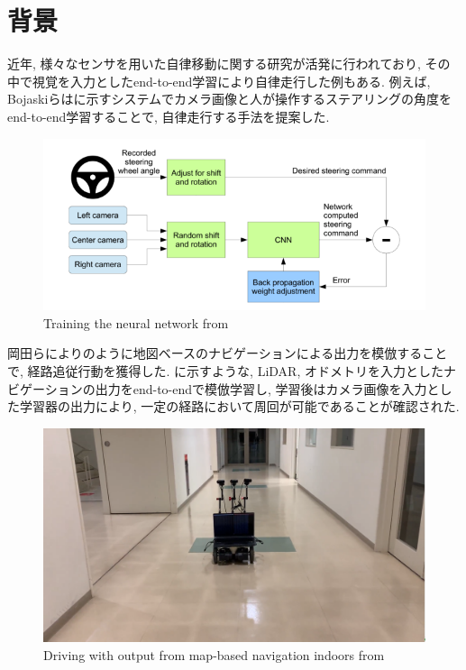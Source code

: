 
\section{背景}
近年, 様々なセンサを用いた自律移動に関する研究が活発に行われており, その中で視覚を入力としたend-to-end学習により自律走行した例もある. 例えば, Bojaskiらはに示すシステムでカメラ画像と人が操作するステアリングの角度をend-to-end学習することで, 自律走行する手法を提案した\cite{bojaski}.

\vspace{20mm}

\begin{figure}[hbtp]
\centering
\includegraphics[keepaspectratio, scale=0.5]
{images/bojaski.png}
\caption{Training the neural network from \cite{bojaski}}
\label{Fig:bojaski}
\end{figure}

\newpage
岡田らによりのように地図ベースのナビゲーションによる出力を模倣することで, 経路追従行動を獲得した\cite{okada-si}. に示すような, LiDAR, オドメトリを入力としたナビゲーションの出力をend-to-endで模倣学習し, 学習後はカメラ画像を入力とした学習器の出力により, 一定の経路において周回が可能であることが確認された. 

\vspace{20mm}

\begin{figure}[h]
     \centering
     \includegraphics[keepaspectratio, scale=0.15]
     {images/tsudanuma2-3.png}
     \caption{Driving with output from map-based navigation indoors from \cite{okada-si}}
     \label{Fig:tsudanuma2-3}
     \end{figure}

